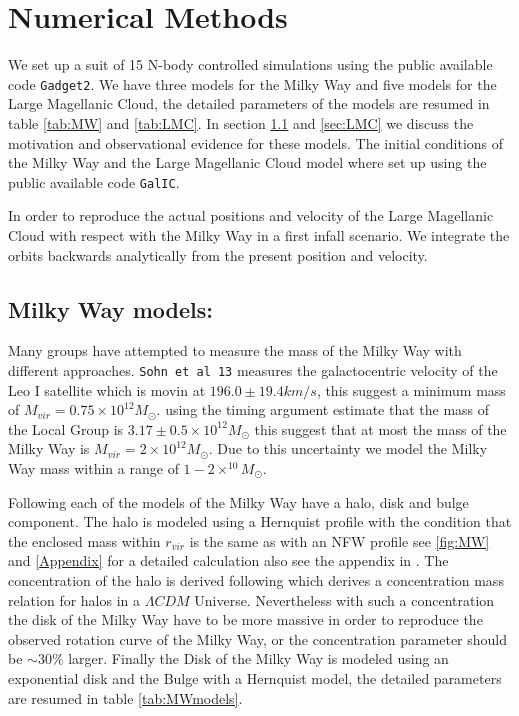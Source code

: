 \section{Numerical Methods}\label{sec:models}

We set up a suit of 15 N-body controlled simulations using the public available code
\verb+Gadget2+. We have three models for the Milky Way and five models
for the Large Magellanic Cloud, the detailed parameters of the models
are resumed in table \ref{tab:MW} and \ref{tab:LMC}. In section
\ref{sec:MW} and \ref{sec:LMC} we discuss the motivation and
observational evidence for these models. The initial conditions of the
Milky Way and the Large Magellanic Cloud model where set up using the
public available code \verb+GalIC+.

In order to reproduce the actual positions and velocity of the Large
Magellanic Cloud with respect with the Milky Way in a first infall
scenario. We integrate the orbits backwards analytically from
the present position and velocity.



\subsection{Milky Way models:}\label{sec:MW}

Many groups have attempted to measure the mass of the Milky Way with
different approaches. \verb+Sohn et al 13+ measures the galactocentric
velocity of the Leo I satellite which is movin at $196.0 \pm 19.4
km/s$, this suggest a minimum mass of $M_{vir} =0.75 \times
10^{12}M_{\odot}$. \citep{vandermarel12} using the timing argument
estimate that the mass of the Local Group is $3.17\pm 0.5 \times 10^
{12}M_{\odot}$ this suggest that at most the mass of the Milky Way is
$M_{vir} = 2 \times 10^{12}M_{\odot}$. Due to this uncertainty we
model the Milky Way mass within a range of $1-2 \times
^{10}M_{\odot}$.

Following \citep{Gomez15} each of the models of the Milky Way have
a halo, disk and bulge component. The halo is modeled using a
Hernquist profile with the condition that the enclosed mass
within $r_{vir}$ is the same as with an NFW profile see \ref{fig:MW}
and \ref{Appendix} for a detailed calculation also see the appendix
in \citep{Vandermarel12}. The concentration of the halo is
derived following \citep{Klypin11} which derives a concentration
mass relation for halos in a $\Lambda CDM$
Universe. Nevertheless with such a concentration the disk of
the Milky Way have to be more massive in order to reproduce the
observed rotation curve of the Milky Way, or the concentration
parameter should be $\sim 30\%$ larger. Finally the Disk of the
Milky Way is modeled using an exponential disk and
the Bulge with a Hernquist model, the detailed parameters are resumed
in table \ref{tab:MWmodels}.

